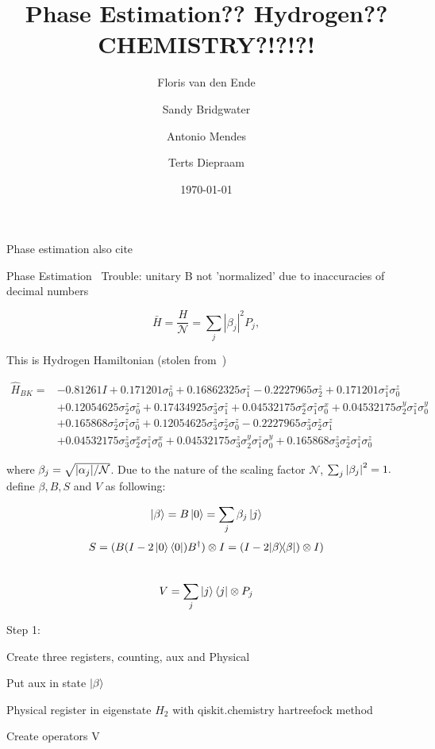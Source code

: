 \documentclass{article}
\title{Phase Estimation?? Hydrogen?? CHEMISTRY?!?!?!}
\author{Floris van den Ende\and Sandy Bridgwater\and Antonio Mendes\and Terts Diepraam}
\date{\today}
\def\kb#1#2{| #1 \rangle\!\langle #2 |}
\begin{document}
\maketitle

Phase estimation also cite \cite{nielsen}

Phase Estimation~\cite{Qiskit-Textbook}
Trouble: unitary B not 'normalized' due to inaccuracies of decimal numbers

\begin{equation}
	\bar H = \frac H{\mathcal{N}} = \sum_j|\beta_j|^2 P_j,
\end{equation}

This is Hydrogen Hamiltonian (stolen from~\cite{seeley})

\begin{align*}
\hat{H}_{B K}=&-0.81261 I+0.171201 \sigma_{0}^{z}+0.16862325 \sigma_{1}^{z}-0.2227965 \sigma_{2}^{z}+0.171201 \sigma_{1}^{z} \sigma_{0}^{z} \\
&+0.12054625 \sigma_{2}^{z} \sigma_{0}^{z}+0.17434925 \sigma_{3}^{z} \sigma_{1}^{z}+0.04532175 \sigma_{2}^{x} \sigma_{1}^{z} \sigma_{0}^{x}+0.04532175 \sigma_{2}^{y} \sigma_{1}^{z} \sigma_{0}^{y} \\
&+0.165868 \sigma_{2}^{z} \sigma_{1}^{z} \sigma_{0}^{z}+0.12054625 \sigma_{3}^{z} \sigma_{2}^{z} \sigma_{0}^{z}-0.2227965 \sigma_{3}^{z} \sigma_{2}^{z} \sigma_{1}^{z} \\
&+0.04532175 \sigma_{3}^{z} \sigma_{2}^{x} \sigma_{1}^{z} \sigma_{0}^{x}+0.04532175 \sigma_{3}^{z} \sigma_{2}^{y} \sigma_{1}^{z} \sigma_{0}^{y}+0.165868 \sigma_{3}^{z} \sigma_{2}^{z} \sigma_{1}^{z} \sigma_{0}^{z}
\end{align*}

where $\beta_j = \sqrt{\abs{\alpha_j}/\mathcal{N}}$. Due to the nature of the scaling factor $\mathcal{N}$, $\sum_j \abs{\beta_j}^2 = 1.$
\\\textcite{poulin} define $\beta, B, S$ and  $V$ as following:

$$
\ket\beta = B\ket 0 = \sum_j \beta_j \ket j$$
$$
S = (B (I - 2 \ket{0}\bra{0}) B^{\dagger}) \otimes I= (I-2\kb \beta \beta) \otimes I)$$
\\
$$
V=\sum_{j}\ket{j}\bra{j} \otimes P_{j}
$$

Step 1:

Create three registers, counting, aux and Physical

Put aux in state $\ket{\beta}$

Physical register in eigenstate $H_2$ with qiskit.chemistry hartreefock method

Create operators V

\printbibliography
\end{document}
